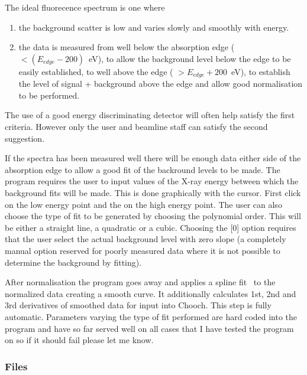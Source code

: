 \documentclass[a4]{article}
\begin{document}
The ideal fluorecence spectrum is one where 
\begin{enumerate}
\item the background scatter is low and varies slowly and smoothly
with energy.
\item the data is measured from well below the absorption edge ( $<
(E_{edge}-200)$~eV), to allow the background level below the edge to
be easily established, to well above the edge ( $> E_{edge}+200$~eV),
to establish the level of signal + background above the edge and allow
good normalisation to be performed.
\end{enumerate}

The use of a good energy discriminating detector will often help
satisfy the first criteria. However only the user and beamline staff
can satisfy the second suggestion.

If the spectra has been measured well there will be enough data either
side of the absorption edge to allow a good fit of the backround
levels to be made. The program requires the user to input values of
the X-ray energy between which the background fits will be made. This
is done graphically with the cursor. First click on the low energy
point and the on the high energy point. The user can also choose the
type of fit to be generated by choosing the polynomial order. This
will be either a straight line, a quadratic or a cubic. Choosing the
[0] option requires that the user select the actual background level
with zero slope (a completely manual option reserved for poorly
measured data where it is not possible to determine the background by
fitting).

After normalisation the program goes away and applies a spline
fit~\cite{Woltring86} to the normalized data creating a smooth
curve. It additionally calculates 1st, 2nd and 3rd derivatives of
smoothed data for input into {\sc Chooch}. This step is fully
automatic.  Parameters varying the type of fit performed are hard
coded into the program and have so far served well on all cases that I
have tested the program on so if it should fail please let me know.

\subsubsection{Files}
\end{document}

